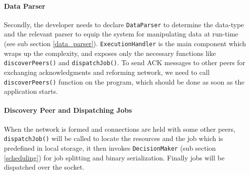 \documentclass{sig-alternate}[10pt]
\begin{document}
\paragraph{Data Parser}

Secondly, the developer needs to declare \texttt{DataParser} to determine the data-type and the relevant parser to equip the system for manipulating data at run-time (see sub section \ref{data_parser}). \texttt{ExecutionHandler} is the main component which wraps up the complexity, and exposes only the necessary functions like \texttt{discoverPeers()} and \texttt{dispatchJob()}. To send ACK messages to other peers for exchanging acknowledgments and reforming network, we need to call \texttt{discoverPeers()} function on the program, which should be done as soon as the application starts.

\begin{figure}
\noindent {}	
  \label{code:get_single_part}

\end{figure}

\paragraph{Discovery Peer and Dispatching Jobs}

When the network is formed and connections are held with some other peers, \texttt{dispatchJob()} will be called to locate the resources and the job which is predefined in local storage, it then invokes \texttt{DecisionMaker} (sub section \ref{scheduling}) for job splitting and binary serialization. Finally jobs will be dispatched over the socket.

\begin{figure}
\noindent {}

\end{figure}
\end{document}
